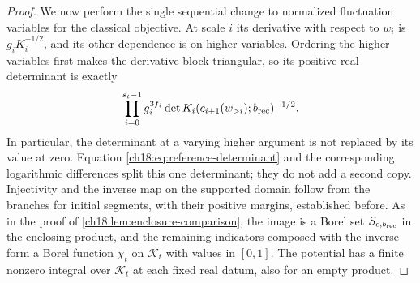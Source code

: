 \begin{proof}
We now perform the single sequential change to normalized fluctuation variables for the classical objective. At scale $i$ its derivative with respect to $w_i$ is $g_iK_i^{-1/2}$, and its other dependence is on higher variables. Ordering the higher variables first makes the derivative block triangular, so its positive real determinant is exactly
\begin{equation}\label{ch18:eq:one-triangular-determinant}
 \prod_{i=0}^{s_t-1}g_i^{3f_i}
     \det K_i(c_{i+1}(w_{>i});b_{\mathrm{rec}})^{-1/2}.
\end{equation}
In particular, the determinant at a varying higher argument is not replaced by its value at zero. Equation \eqref{ch18:eq:reference-determinant} and the corresponding logarithmic differences split this one determinant; they do not add a second copy. Injectivity and the inverse map on the supported domain follow from the branches for initial segments, with their positive margins, established before. As in the proof of \cref{ch18:lem:enclosure-comparison}, the image is a Borel set $S_{c,b_{\mathrm{rec}}}$ in the enclosing product, and the remaining indicators composed with the inverse form a Borel function $\chi_t$ on $\mathcal K_t$ with values in $[0,1]$. The potential has a finite nonzero integral over $\mathcal K_t$ at each fixed real datum, also for an empty product.


\end{proof}
